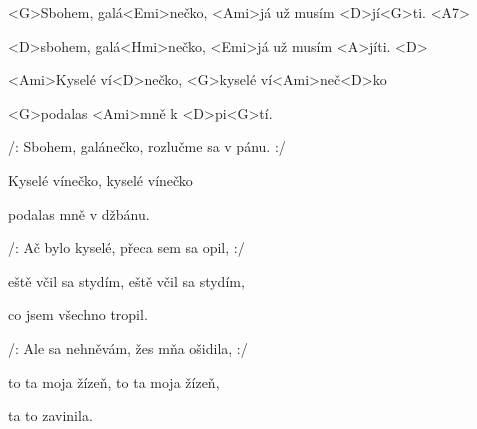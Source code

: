 

\zs
<G>Sbohem, galá<Emi>nečko,
<Ami>já už musím <D>jí<G>ti. <A7> 

<D>sbohem, galá<Hmi>nečko,
<Emi>já už musím <A>jíti. <D> 

<Ami>Kyselé ví<D>nečko, <G>kyselé ví<Ami>neč<D>ko 

<G>podalas <Ami>mně k <D>pi<G>tí.
\ks

\zs
/: Sbohem, galánečko, rozlučme sa v pánu. :/

Kyselé vínečko, kyselé vínečko

podalas mně v džbánu.
\ks

\zs
/: Ač bylo kyselé, přeca sem sa opil, :/

eště včil sa stydím, eště včil sa stydím,

co jsem všechno tropil.
\ks

\zs
/: Ale sa nehněvám, žes mňa ošidila, :/

to ta moja žízeň, to ta moja žízeň,

ta to zavinila.
\ks
\kp
